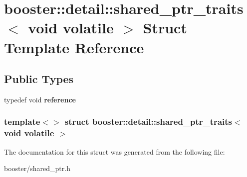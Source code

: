 \section{booster\-:\-:detail\-:\-:shared\-\_\-ptr\-\_\-traits$<$ void volatile $>$ \-Struct \-Template \-Reference}
\label{structbooster_1_1detail_1_1shared__ptr__traits_3_01void_01volatile_01_4}
\subsection*{\-Public \-Types}
\begin{DoxyCompactItemize}
\item 
typedef void {\bfseries reference}\label{structbooster_1_1detail_1_1shared__ptr__traits_3_01void_01volatile_01_4_a50f14dc01ccc1b66de69860c6523b417}

\end{DoxyCompactItemize}
\subsubsection*{template$<$$>$ struct booster\-::detail\-::shared\-\_\-ptr\-\_\-traits$<$ void volatile $>$}



\-The documentation for this struct was generated from the following file\-:\begin{DoxyCompactItemize}
\item 
booster/shared\-\_\-ptr.\-h\end{DoxyCompactItemize}
